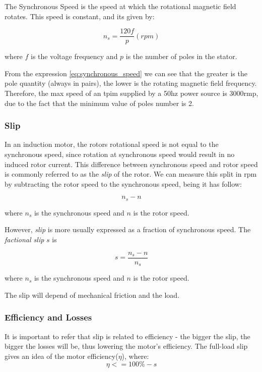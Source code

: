 The Synchronous Speed is the speed at which the rotational magnetic field rotates. This speed is constant, and its given by:

\begin{equation} \label{eq:synchronous_speed}
	 n_{s} = \frac{120f}{p}(rpm)
\end{equation}

where $f$ is the voltage frequency and $p$ is the number of poles in the stator.

From the expression \ref{eq:synchronous_speed} we can see that the greater is the pole quantity (always in pairs), the lower is the rotating magnetic field frequency.
Therefore, the max speed of an \acrshort{tpim} supplied by a 50hz power source is 3000rmp, due to the fact that the minimum value of poles number is 2.


\subsubsection{Slip}
In an induction motor, the rotors rotational speed is not equal to the synchronous speed, since rotation at synchronous speed would result in no induced rotor current. This difference between synchronous speed and rotor speed is commonly referred to as the \emph{slip} of the rotor. We can measure this split in rpm by subtracting the rotor speed to the synchronous speed, being it has follow:

\begin{equation} \label{eq:split}
	 n_{s} - n
\end{equation}

where $n_{s}$ is the synchronous speed and $n$ is the rotor speed.

However, \emph{slip} is more usually expressed as a fraction of synchronous speed. The \emph{factional slip} $s$ is

\begin{equation} \label{eq:perc_split}
	s = \frac{n_{s} - n}{n_{s}} 
\end{equation}

where $n_{s}$ is the synchronous speed and $n$ is the rotor speed.

The slip will depend of mechanical friction and the load.

\subsubsection{Efficiency and Losses}

It is important to refer that slip is related to efficiency - the bigger the slip, the bigger the losses will be, thus lowering the motor's efficiency. The full-load slip gives an idea of the motor efficiency($\eta$), where:
\begin{equation} \label{eq:efficiency_max}
	\eta <= 100\% - s
\end{equation}

